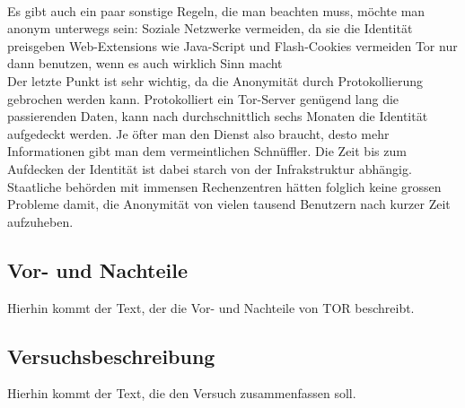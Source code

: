 \\
Es gibt auch ein paar sonstige Regeln, die man beachten muss, möchte man anonym unterwegs sein:
Soziale Netzwerke vermeiden, da sie die Identität preisgeben
Web-Extensions wie Java-Script und Flash-Cookies vermeiden
Tor nur dann benutzen, wenn es auch wirklich Sinn macht
\\
Der letzte Punkt ist sehr wichtig, da die Anonymität durch Protokollierung gebrochen werden kann. Protokolliert ein Tor-Server genügend lang die passierenden Daten, kann nach durchschnittlich sechs Monaten die Identität aufgedeckt werden. Je öfter man den Dienst also braucht, desto mehr Informationen gibt man dem vermeintlichen Schnüffler. Die Zeit bis zum Aufdecken der Identität ist dabei starch von der Infrakstruktur abhängig. Staatliche behörden mit immensen Rechenzentren hätten folglich keine grossen Probleme damit, die Anonymität von vielen tausend Benutzern nach kurzer Zeit aufzuheben.
\subsection{Vor- und Nachteile}
Hierhin kommt der Text, der die Vor- und Nachteile von TOR beschreibt.
\subsection{Versuchsbeschreibung}
Hierhin kommt der Text, die den Versuch zusammenfassen soll.
